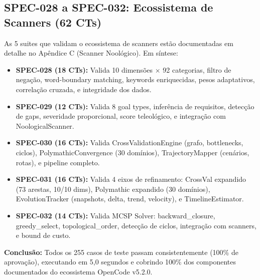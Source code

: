 \subsection{SPEC-028 a SPEC-032: Ecossistema de Scanners (62 CTs)}

As 5 suites que validam o ecossistema de scanners estão documentadas em detalhe no Apêndice C (Scanner Noológico). Em síntese:

\begin{itemize}
  \item \textbf{SPEC-028 (18 CTs):} Valida 10 dimensões $\times$ 92 categorias, filtro de negação, word-boundary matching, keywords enriquecidas, pesos adaptativos, correlação cruzada, e integridade dos dados.
  \item \textbf{SPEC-029 (12 CTs):} Valida 8 goal types, inferência de requisitos, detecção de gaps, severidade proporcional, score teleológico, e integração com NoologicalScanner.
  \item \textbf{SPEC-030 (16 CTs):} Valida CrossValidationEngine (grafo, bottlenecks, ciclos), PolymathicConvergence (30 domínios), TrajectoryMapper (cenários, rotas), e pipeline completo.
  \item \textbf{SPEC-031 (16 CTs):} Valida 4 eixos de refinamento: CrossVal expandido (73 arestas, 10/10 dims), Polymathic expandido (30 domínios), EvolutionTracker (snapshots, delta, trend, velocity), e TimelineEstimator.
  \item \textbf{SPEC-032 (14 CTs):} Valida MCSP Solver: backward\_closure, greedy\_select, topological\_order, detecção de ciclos, integração com scanners, e bound de custo.
\end{itemize}

\textbf{Conclusão:} Todos os 255 casos de teste passam consistentemente (100\% de aprovação), executando em 5,0 segundos e cobrindo 100\% dos componentes documentados do ecossistema OpenCode v5.2.0.

\newpage
